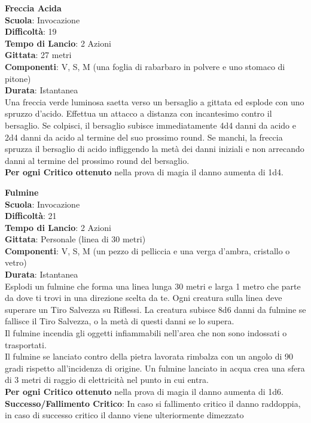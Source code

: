 \begin{multicols}{2}
\medskip\textbf{Freccia Acida}\\
\textbf{Scuola}: Invocazione\\
\textbf{Difficoltà}: 19\\
\textbf{Tempo di Lancio}: 2 Azioni\\
\textbf{Gittata}: 27 metri\\
\textbf{Componenti}: V, S, M (una foglia di rabarbaro in polvere e uno stomaco di pitone)\\
\textbf{Durata}: Istantanea\\
Una freccia verde luminosa saetta verso un bersaglio a gittata ed esplode con uno spruzzo d'acido. Effettua un attacco a distanza con incantesimo contro il bersaglio. Se colpisci, il bersaglio subisce immediatamente 4d4 danni da acido e 2d4 danni da acido al termine del suo prossimo round. Se manchi, la freccia spruzza il bersaglio di acido infliggendo la metà dei danni iniziali e non arrecando danni al termine del prossimo round del bersaglio.\\
\textbf{Per ogni Critico ottenuto} nella prova di magia il danno aumenta di 1d4.

\medskip\textbf{Fulmine}\\
\textbf{Scuola}: Invocazione\\
\textbf{Difficoltà}: 21\\
\textbf{Tempo di Lancio}: 2 Azioni\\
\textbf{Gittata}: Personale (linea di 30 metri)\\
\textbf{Componenti}: V, S, M (un pezzo di pelliccia e una verga d'ambra, cristallo o vetro)\\
\textbf{Durata}: Istantanea\\
Esplodi un fulmine che forma una linea lunga 30 metri e larga 1 metro che parte da dove ti trovi in una direzione scelta da te. Ogni creatura sulla linea deve superare un Tiro Salvezza su Riflessi. La creatura subisce 8d6 danni da fulmine se fallisce il Tiro Salvezza, o la metà di questi danni se lo supera.\\
Il fulmine incendia gli oggetti infiammabili nell'area che non sono indossati o trasportati.\\
Il fulmine se lanciato contro della pietra lavorata rimbalza con un angolo di 90 gradi rispetto all'incidenza di origine. Un fulmine lanciato in acqua crea una sfera di 3 metri di raggio di elettricità nel punto in cui entra.\\
\textbf{Per ogni Critico ottenuto} nella prova di magia il danno aumenta di 1d6.\\
\textbf{Successo/Fallimento Critico}: In caso si fallimento critico il danno raddoppia, in caso di successo critico il danno viene ulteriormente dimezzato


\end{multicols}
